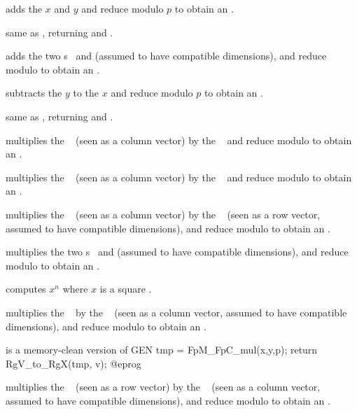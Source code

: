  adds the  $x$ and $y$
and reduce modulo $p$ to obtain an .

 same as , returning and
.

 adds the two s~
and  (assumed to have compatible dimensions), and reduce modulo
 to obtain an .

 subtracts the  $y$ to
the  $x$ and reduce modulo $p$ to obtain an .

 same as , returning and
.

 multiplies the ~
(seen as a column vector) by the ~ and reduce modulo  to
obtain an .

 multiplies the ~
(seen as a column vector) by the ~ and reduce modulo  to
obtain an .

 multiplies the ~
(seen as a column vector) by the ~ (seen as a row vector,
assumed to have compatible dimensions), and reduce modulo  to obtain
an .

 multiplies the two s~
and  (assumed to have compatible dimensions), and reduce modulo
 to obtain an .

 computes $x^n$ where $x$ is a
square .

 multiplies the ~
by the ~ (seen as a column vector, assumed to have compatible
dimensions), and reduce modulo  to obtain an .

 is a memory-clean
version of
\bprog
  GEN tmp = FpM_FpC_mul(x,y,p);
  return RgV_to_RgX(tmp, v);
@eprog

 multiplies the ~
(seen as a row vector) by the ~ (seen as a column vector,
assumed to have compatible dimensions), and reduce modulo  to obtain
an .

